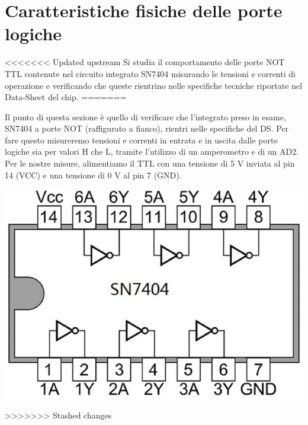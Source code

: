 \documentclass[10pt, a4paper, italian]{article}
\begin{document}
\section{Caratteristiche fisiche delle porte logiche}
<<<<<<< Updated upstream
Si studia il comportamento delle porte NOT TTL contenute nel circuito integrato
SN7404 misurando le tensioni e correnti di operazione e verificando che queste
rientrino nelle specifiche tecniche riportate nel Data-Sheet del chip.
=======
\begin{minipage}{0.7\textwidth}
    Il punto di questa sezione è quello di verificare che l'integrato preso in esame, SN7404 a porte NOT (raffigurato a fianco), rientri nelle specifiche del DS. Per fare questo misureremo tensioni e correnti in entrata e in uscita dalle porte logiche sia per valori H che L, tramite l'utilizzo di un amperometro e di un AD2.
    Per le nostre misure, alimentiamo il TTL con una tensione di 5 V inviata al pin 14 (VCC) e una tensione di 0 V al pin 7 (GND).
\end{minipage}
\begin{minipage}{0.3\textwidth}
    \includegraphics[width=\textwidth]{NOT.jpg}
    \label{NOT}
\end{minipage}
>>>>>>> Stashed changes
\end{document}
